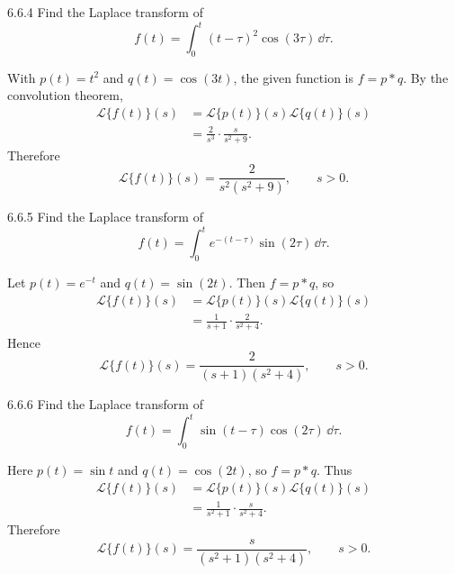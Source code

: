 \documentclass[11pt,oneside]{article}
\begin{document}
\begin{problem}{6.6.4}
Find the Laplace transform of
\[
    f(t)=\int_0^t(t-\tau)^2\cos(3\tau)\,\dd\tau.
\]
\end{problem}

\begin{solution}
With $p(t)=t^2$ and $q(t)=\cos(3t)$, the given function is $f=p\ast q$. By the convolution theorem,
\[
    \begin{aligned}
    \mathcal{L}\{f(t)\}(s)
      &=\mathcal{L}\{p(t)\}(s)\mathcal{L}\{q(t)\}(s)\\
      &=\frac{2}{s^3}\cdot\frac{s}{s^2+9}.
    \end{aligned}
\]
Therefore
\[
    \boxed{\mathcal{L}\{f(t)\}(s)=\frac{2}{s^2(s^2+9)}},
    \qquad s>0.
\]
\end{solution}

\begin{problem}{6.6.5}
Find the Laplace transform of
\[
    f(t)=\int_0^t e^{-(t-\tau)}\sin(2\tau)\,\dd\tau.
\]
\end{problem}

\begin{solution}
Let $p(t)=e^{-t}$ and $q(t)=\sin(2t)$. Then $f=p\ast q$, so
\[
    \begin{aligned}
    \mathcal{L}\{f(t)\}(s)
       &=\mathcal{L}\{p(t)\}(s)\mathcal{L}\{q(t)\}(s)\\
       &=\frac{1}{s+1}\cdot\frac{2}{s^2+4}.
    \end{aligned}
\]
Hence
\[
    \boxed{\mathcal{L}\{f(t)\}(s)=\frac{2}{(s+1)(s^2+4)}},
    \qquad s>0.
\]
\end{solution}

\begin{problem}{6.6.6}
Find the Laplace transform of
\[
    f(t)=\int_0^t\sin(t-\tau)\cos(2\tau)\,\dd\tau.
\]
\end{problem}

\begin{solution}
Here $p(t)=\sin t$ and $q(t)=\cos(2t)$, so $f=p\ast q$. Thus
\[
    \begin{aligned}
    \mathcal{L}\{f(t)\}(s)
       &=\mathcal{L}\{p(t)\}(s)\mathcal{L}\{q(t)\}(s)\\
       &=\frac{1}{s^2+1}\cdot\frac{s}{s^2+4}.
    \end{aligned}
\]
Therefore
\[
    \boxed{\mathcal{L}\{f(t)\}(s)=\frac{s}{(s^2+1)(s^2+4)}},
    \qquad s>0.
\]
\end{solution}
\end{document}
